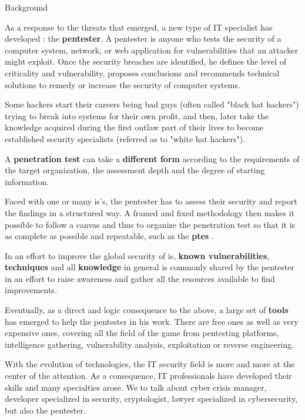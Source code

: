 \begin{chaptercover}{Background}
\begin{summary}
As a response to the threats that emerged, a new type of IT specialist has developed : the \textbf{pentester}. A pentester is anyone who tests the security of a computer system, network, or web application for vulnerabilities that an attacker might exploit. Once the security breaches are identified, he defines the level of criticality and vulnerability, proposes conclusions and recommends technical solutions to remedy or increase the security of computer systems.

\begin{info}
Some hackers start their careers being bad guys (often called "black hat hackers") trying to break into systems for their own profit, and then, later take the knowledge acquired during the first outlaw part of their lives to become established security specialists (referred as to "white hat hackers").
\end{info}

A \textbf{penetration test} can take a \textbf{different form} according to the requirements of the target organization, the assessment depth and the degree of starting information.

Faced with one or many \acrshort{is}'s, the pentester has to assess their security and report the findings in a structured way. A framed and fixed methodology then makes it possible to follow a canvas and thus to organize the penetration test so that it is as complete as possible and repeatable, such as the \textbf{\acrshort{ptes}} \cite{ptes}.

In an effort to improve the global security of \acrshort{is}, \textbf{known vulnerabilities}, \textbf{techniques} and all \textbf{knowledge} in general is commonly shared by the pentester in an effort to raise awareness and gather all the resources available to find improvements.

Eventually, as a direct and logic consequence to the above, a large set of \textbf{tools} has emerged to help the pentester in his work. There are free ones as well as very expensive ones, covering all the field of the game from pentesting platforms, intelligence gathering, vulnerability analysis, exploitation or reverse engineering.
\end{summary}

\begin{discussion}
With the evolution of technologies, the IT security field is more and more at the center of the attention. As a consequence, IT professionals have developed their skills and many specialties arose. We to talk about cyber crisis manager, developer specialized in security, cryptologist, lawyer specialized in cybersecurity, but also the pentester.


\end{discussion}
\end{chaptercover}
